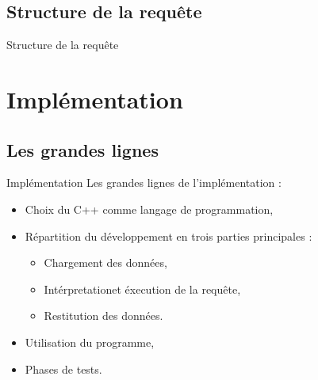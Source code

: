 \documentclass[10pt,handout]{beamer}
\newif\ifplacelogo %
\begin{document}
\subsection{Structure de la requête}

\placelogofalse
\begin{frame}{Structure de la requête}
\end{frame}
\placelogotrue



\section{Implémentation}

\subsection{Les grandes lignes}

\begin{frame}{Implémentation}
  Les grandes lignes de l'implémentation :
  \begin{itemize}
    \item Choix du C++ comme langage de programmation,
    \item Répartition du développement en trois parties principales :
    \begin{itemize}
      \item Chargement des données,
      \item Intérpretationet éxecution de la requête,
      \item Restitution des données.
    \end{itemize}
    \item Utilisation du programme,
    \item Phases de tests.
  \end{itemize}
\end{frame}
\end{document}
